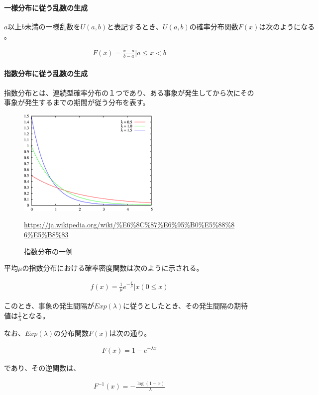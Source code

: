 \documentclass[dvipdfmx]{jsarticle}
\begin{document}
\paragraph{一様分布に従う乱数の生成}
$a以上b未満の一様乱数をU(a,b)と表記するとき、U(a, b)の確率分布関数F(x)は次のようになる$。
\begin{center}
  \begin{align*}
    F(x) = \frac{x-a}{b-a} | a \leq x < b
  \end{align*}
\end{center}
\paragraph{指数分布に従う乱数の生成}
指数分布とは、連続型確率分布の１つであり、ある事象が発生してから次にその事象が発生するまでの期間が従う分布を表す。
\begin{figure}[H]
  \centering
  \includegraphics[scale=0.6]{sisuu.png}
  \caption{指数分布の一例}
  \url{https://ja.wikipedia.org/wiki/%E6%8C%87%E6%95%B0%E5%88%86%E5%B8%83}
\end{figure}
平均$\mu$の指数分布における確率密度関数は次のように示される。
\begin{center}
  \begin{align*}
    f(x) = \frac{1}{\mu}e^{-\frac{x}{\mu}} | x(0 \leq x)
  \end{align*}
\end{center}
このとき、事象の発生間隔が$Exp(\lambda )$に従うとしたとき、その発生間隔の期待値は$\frac{1}{\lambda}$となる。\par
なお、$Exp(\lambda)$の分布関数$F(x)$は次の通り。
\begin{center}
  \begin{align*}
    F(x) = 1-e^{-\lambda x}
  \end{align*}
\end{center}
であり、その逆関数は、
\begin{center}
  \begin{align*}
    F^{-1}(x) = -\frac{\log(1-x)}{\lambda}
  \end{align*}
\end{center}
\end{document}
